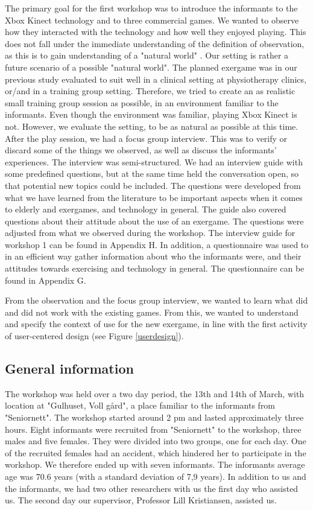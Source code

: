 The primary goal for the first workshop was to introduce the informants to the Xbox Kinect technology and to three commercial games. We wanted to observe how they interacted with the technology and how well they enjoyed playing. This does not fall under the immediate understanding of the definition of observation, as this is to gain understanding of a "natural world" \cite{tjora}. Our setting is rather a future scenario of a possible "natural world". The planned exergame was in our previous study \cite{project} evaluated to suit well in a clinical setting at physiotherapy clinics, or/and in a training group setting. Therefore, we tried to create an as realistic small training group session as possible, in an environment familiar to the informants. Even though the environment was familiar, playing Xbox Kinect is not. However, we evaluate the setting, to be as natural as possible at this time. After the play session, we had a focus group interview. This was to verify or discard some of the things we observed, as well as discuss the informants' experiences. The interview was semi-structured. We had an interview guide with some predefined questions, but at the same time held the conversation open, so that potential new topics could be included. The questions were developed from what we have learned from the literature to be important aspects when it comes to elderly and exergames, and technology in general. The guide also covered questions about their attitude about the use of an exergame. The questions were adjusted from what we observed during the workshop. The interview guide for workshop 1 can be found in Appendix H. In addition, a questionnaire was used to in an efficient way gather information about  who the informants were, and their attitudes towards exercising and technology in general. The questionnaire can be found in Appendix G.

From the observation and the focus group interview, we wanted to learn what did and did not work with the existing games. From this, we wanted to understand and specify the context of use for the new exergame, in line with the first activity of user-centered design (see Figure \ref{userdesign}). 

\subsection{General information}
The workshop was held over a two day period, the 13th and 14th of March, with location at "Gulhuset, Voll gård", a place familiar to the informants from "Seniornett". The workshop started around 2 pm and lasted approximately three hours. Eight informants were recruited from "Seniornett" to the workshop, three males and five females. They were divided into two groups, one for each day. One of the recruited females had an accident, which hindered her to participate in the workshop. We therefore ended up with seven informants. The informants average age was 70.6 years (with a standard deviation of 7,9 years). In addition to us and the informants, we had two other researchers with us the first day who assisted us. The second day our supervisor, Professor Lill Kristiansen, assisted us. 

